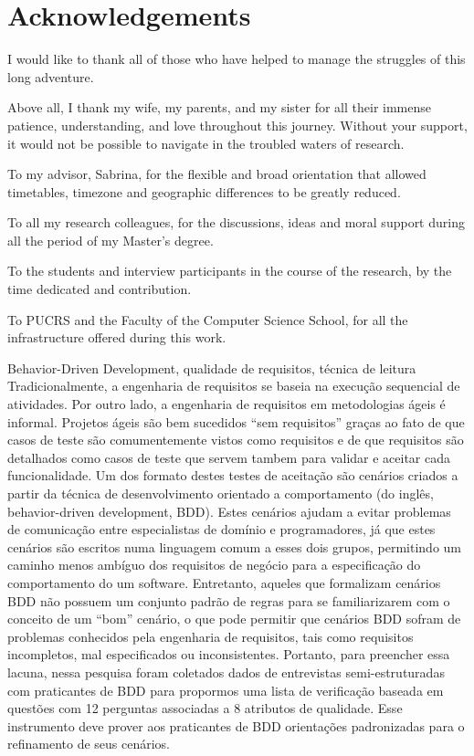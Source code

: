 \chapter*{Acknowledgements}
\thispagestyle{empty}

I would like to thank all of those who have helped to manage the struggles of this long adventure.

Above all, I thank my wife, my parents, and my sister for all their immense patience, understanding, and love throughout this journey. Without your support, it would not be possible to navigate in the troubled waters of research.

To my advisor, Sabrina, for the flexible and broad orientation that allowed timetables, timezone and geographic differences to be greatly reduced. 

To all my research colleagues, for the discussions, ideas and moral support during all the period of my Master's degree.

To the students and interview participants in the course of the research, by the time dedicated and contribution.

To PUCRS and the Faculty of the Computer Science School, for all the infrastructure offered during this work.

\clearpage

\begin{resumo}{Behavior-Driven Development, qualidade de requisitos, técnica de leitura}
Tradicionalmente, a engenharia de requisitos se baseia na execução sequencial de atividades. Por outro lado, a engenharia de requisitos em metodologias ágeis é informal. Projetos ágeis são bem sucedidos ``sem requisitos'' graças ao fato de que casos de teste são comumentemente vistos como requisitos e de que requisitos são detalhados como casos de teste que servem tambem para validar e aceitar cada funcionalidade. Um dos formato destes testes de aceitação são cenários criados a partir da técnica de desenvolvimento orientado a comportamento (do inglês, behavior-driven development, BDD). Estes cenários ajudam a evitar problemas de comunicação entre especialistas de domínio e programadores, já que estes cenários são escritos numa linguagem comum a esses dois grupos, permitindo um caminho menos ambíguo dos requisitos de negócio para a especificação do comportamento do um software. Entretanto, aqueles que formalizam cenários BDD não possuem um conjunto padrão de regras para se familiarizarem com o conceito de um ``bom'' cenário, o que pode permitir que cenários BDD sofram de problemas conhecidos pela engenharia de requisitos, tais como requisitos incompletos, mal especificados ou inconsistentes. Portanto, para preencher essa lacuna, nessa pesquisa foram coletados dados de entrevistas semi-estruturadas com praticantes de BDD para propormos uma lista de verificação baseada em questões com 12 perguntas associadas a 8 atributos de qualidade. Esse instrumento deve prover aos praticantes de BDD orientações padronizadas para o refinamento de seus cenários.
\end{resumo}

